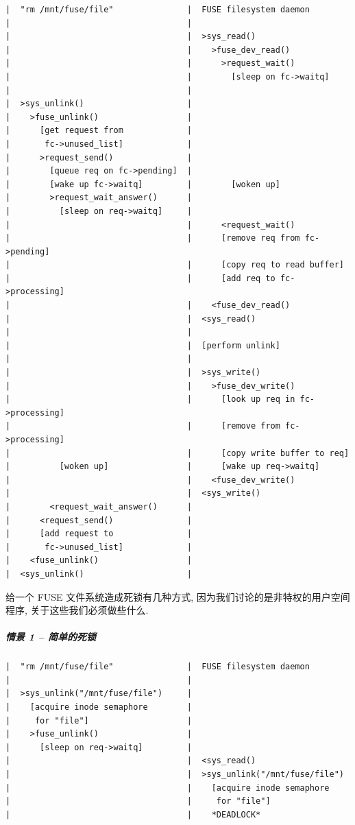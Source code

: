 \documentclass[nofonts]{ctexart}
\begin{document}
\begin{verbatim}
|  "rm /mnt/fuse/file"               |  FUSE filesystem daemon
|                                    |
|                                    |  >sys_read()
|                                    |    >fuse_dev_read()
|                                    |      >request_wait()
|                                    |        [sleep on fc->waitq]
|                                    |
|  >sys_unlink()                     |
|    >fuse_unlink()                  |
|      [get request from             |
|       fc->unused_list]             |
|      >request_send()               |
|        [queue req on fc->pending]  |
|        [wake up fc->waitq]         |        [woken up]
|        >request_wait_answer()      |
|          [sleep on req->waitq]     |
|                                    |      <request_wait()
|                                    |      [remove req from fc->pending]
|                                    |      [copy req to read buffer]
|                                    |      [add req to fc->processing]
|                                    |    <fuse_dev_read()
|                                    |  <sys_read()
|                                    |
|                                    |  [perform unlink]
|                                    |
|                                    |  >sys_write()
|                                    |    >fuse_dev_write()
|                                    |      [look up req in fc->processing]
|                                    |      [remove from fc->processing]
|                                    |      [copy write buffer to req]
|          [woken up]                |      [wake up req->waitq]
|                                    |    <fuse_dev_write()
|                                    |  <sys_write()
|        <request_wait_answer()      |
|      <request_send()               |
|      [add request to               |
|       fc->unused_list]             |
|    <fuse_unlink()                  |
|  <sys_unlink()                     |
\end{verbatim}

给一个 FUSE 文件系统造成死锁有几种方式, 因为我们讨论的是非特权的用户空间
程序, 关于这些我们必须做些什么.

\subparagraph{情景 1 --
简单的死锁}\label{ux60c5ux666f-1-ux7b80ux5355ux7684ux6b7bux9501}

\begin{verbatim}
|  "rm /mnt/fuse/file"               |  FUSE filesystem daemon
|                                    |
|  >sys_unlink("/mnt/fuse/file")     |
|    [acquire inode semaphore        |
|     for "file"]                    |
|    >fuse_unlink()                  |
|      [sleep on req->waitq]         |
|                                    |  <sys_read()
|                                    |  >sys_unlink("/mnt/fuse/file")
|                                    |    [acquire inode semaphore
|                                    |     for "file"]
|                                    |    *DEADLOCK*
\end{verbatim}
\end{document}
